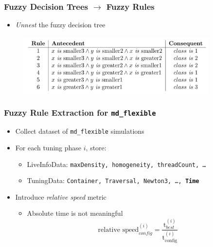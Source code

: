 \documentclass[
	10pt,
	t		%
]{beamer}
\begin{document}
\begin{frame}

	\frametitle{Fuzzy Decision Trees $\rightarrow$ Fuzzy Rules}
	
	\begin{itemize}
		\item \textit{Unnest} the fuzzy decision tree
	\end{itemize}
	
	\begin{figure}
		\centering
		\includegraphics[width=0.9\textwidth]{figures/extracted-rules.png}
	\end{figure}
	
\end{frame}


\begin{frame}
	\frametitle{Fuzzy Rule Extraction for \texttt{md\_flexible}}
	
	\begin{itemize}
		\item Collect dataset of \texttt{md\_flexible} simulations
		\item For each tuning phase $i$, store:
		      \begin{itemize}
			      \item LiveInfoData: {\footnotesize \texttt{maxDensity, homogeneity, threadCount, \dots} }
			      \item TuningData: {\footnotesize \texttt{Container, Traversal, Newton3, \dots, \textbf{Time}} }
		      \end{itemize}
		\item Introduce \textit{relative speed} metric
		      \begin{itemize}
			      \item Absolute time is not meaningful
			            \[ \text{relative speed}_{config}^{(i)} = \frac{\text{t}_{best}^{(i)}}{\text{t}_{\text{config}}^{(i)}} \]
		      \end{itemize}
	\end{itemize}
	
\end{frame}
\end{document}
